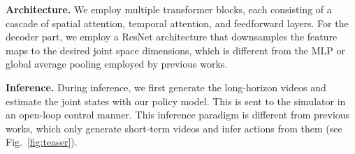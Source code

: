 \documentclass[letterpaper, 10 pt, conference]{ieeeconf}  %
\begin{document}
\noindent\textbf{Architecture.} We employ multiple transformer blocks, each consisting of a cascade of spatial attention, temporal attention, and feedforward layers. For the decoder part, we employ a ResNet architecture that downsamples the feature maps to the desired joint space dimensions, which is different from the MLP or global average pooling employed by previous works. 

\noindent\textbf{Inference.} During inference, we first generate the long-horizon videos and estimate the joint states with our policy model. This is sent to the simulator in an open-loop control manner. This inference paradigm is different from previous works, which only generate short-term videos and infer actions from them (see Fig.~\ref{fig:teaser}).











\end{document}
